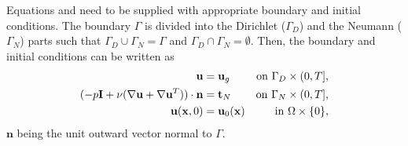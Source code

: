Equations  and  need to be supplied with appropriate boundary and initial conditions. The boundary $\Gamma$ is divided into the Dirichlet ($\Gamma_D$) and the Neumann ($\Gamma_N$) parts such that $\Gamma_D\cup\Gamma_N=\Gamma$ and $\Gamma_D\cap\Gamma_N=\emptyset$. Then, the boundary and initial conditions can be written as
\begin{align}
\label{eq-C7_NS_strong_Dir}
{\bf u}&={\bf u}_g&\mbox{on $\Gamma_D\times(0,T]$,}\\
\label{eq-C7_NS_strong_Neu}
(-p\mathbf{I}+\nu(\nabla{\bf u}+\nabla{\bf u}^T))\cdot\mathbf{n}&=\mathbf{t}_N&\mbox{on $\Gamma_N\times(0,T]$,}\\
\label{eq-C7_NS_strong_Ini}
{\bf u}({\bf x},0)&={\bf u}_0({\bf x})&\mbox{in $\Omega\times\{0\}$,}
\end{align}
$\mathbf{n}$ being the unit outward vector normal to $\Gamma$.


